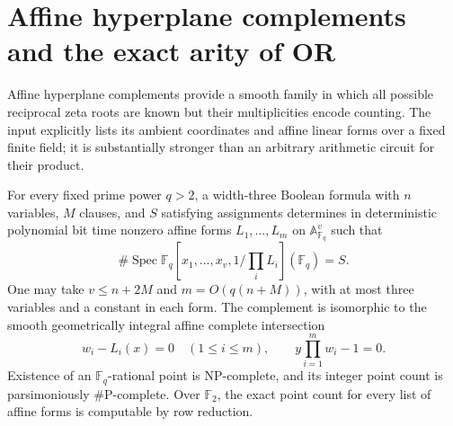 \section{Affine hyperplane complements and the exact arity of OR}
\label{sec:arrangements}
Affine hyperplane complements provide a smooth family in which all possible reciprocal zeta roots are known but their multiplicities encode counting. The input explicitly lists its ambient coordinates and affine linear forms over a fixed finite field; it is substantially stronger than an arbitrary arithmetic circuit for their product.

\begin{theorem}
\label{ar:complement}
For every fixed prime power $q>2$, a width-three Boolean formula with $n$ variables, $M$ clauses, and $S$ satisfying assignments determines in deterministic polynomial bit time nonzero affine forms $L_1,\ldots,L_m$ on $\mathbb A^v_{\mathbb F_q}$ such that
\[
 \#\operatorname{Spec}\mathbb F_q[x_1,\ldots,x_v,1/\prod_iL_i]
                 (\mathbb F_q)=S.
\]
One may take $v\le n+2M$ and $m=O(q(n+M))$, with at most three variables and a constant in each form. The complement is isomorphic to the smooth geometrically integral affine complete intersection
\[
 w_i-L_i(x)=0\quad(1\le i\le m),\qquad
                  y\prod_{i=1}^mw_i-1=0.
\]
Existence of an $\mathbb F_q$-rational point is NP-complete, and its integer point count is parsimoniously $\#\mathrm P$-complete. Over $\mathbb F_2$, the exact point count for every list of affine forms is computable by row reduction.
\end{theorem}
